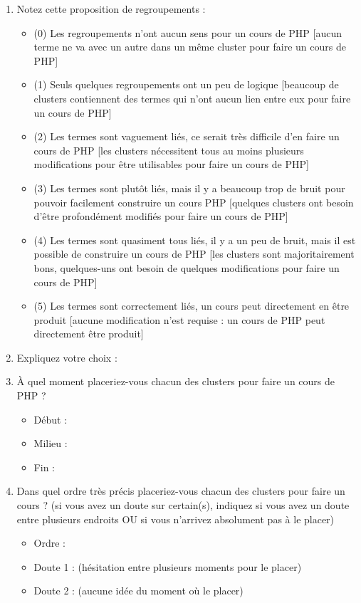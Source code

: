 \begin{enumerate}
\item Notez cette proposition de regroupements :
	\begin{itemize}
	\item[] (0) Les regroupements n'ont aucun sens pour un cours de PHP
		[aucun terme ne va avec un autre dans un même cluster pour faire un cours de PHP]

	\item[] (1) Seuls quelques regroupements ont un peu de logique
		[beaucoup de clusters contiennent des termes qui n'ont aucun lien entre eux pour faire un cours de PHP]
	\item[] (2) Les termes sont vaguement liés, ce serait très difficile d'en faire un cours de PHP
		[les clusters nécessitent tous au moins plusieurs modifications pour être utilisables pour faire un cours de PHP]
	\item[] (3) Les termes sont plutôt liés, mais il y a beaucoup trop de bruit pour pouvoir facilement construire un cours PHP
		[quelques clusters ont besoin d'être profondément modifiés pour faire un cours de PHP]

	\item[] (4) Les termes sont quasiment tous liés, il y a un peu de bruit, mais il est possible de construire un cours de PHP
		[les clusters sont majoritairement bons, quelques-uns ont besoin de quelques modifications pour faire un cours de PHP]

	\item[] (5) Les termes sont correctement liés, un cours peut directement en être produit
		[aucune modification n'est requise : un cours de PHP peut directement être produit]
	\end{itemize}

\item Expliquez votre choix :

\item À quel moment placeriez-vous chacun des clusters pour faire un cours de PHP ?
	\begin{itemize}
	\item[] Début :
	\item[] Milieu :
	\item[] Fin :
	\end{itemize}

\item Dans quel ordre très précis placeriez-vous chacun des clusters pour faire un cours ?
	(si vous avez un doute sur certain(s), indiquez si vous avez un doute entre plusieurs endroits OU si vous n'arrivez absolument pas à le placer)
	\begin{itemize}
	\item[] Ordre :
	\item[] Doute 1 : (hésitation entre plusieurs moments pour le placer)
	\item[]	Doute 2 : (aucune idée du moment où le placer)
	\end{itemize}
\end{enumerate}


